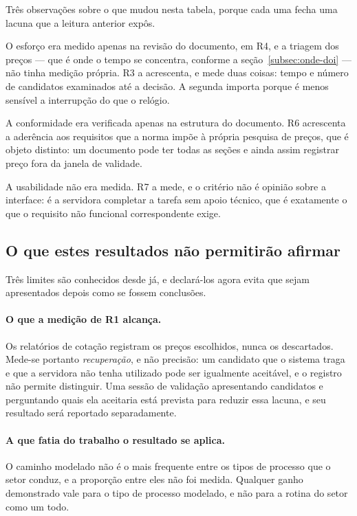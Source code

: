Três observações sobre o que mudou nesta tabela, porque cada uma fecha uma
lacuna que a leitura anterior expôs.

O esforço era medido apenas na revisão do documento, em R4, e a triagem dos
preços — que é onde o tempo se concentra, conforme a
seção~\ref{subsec:onde-doi} — não tinha medição própria. R3 a acrescenta, e
mede duas coisas: tempo e número de candidatos examinados até a decisão. A
segunda importa porque é menos sensível a interrupção do que o relógio.

A conformidade era verificada apenas na estrutura do documento. R6 acrescenta a
aderência aos requisitos que a norma impõe à própria pesquisa de preços, que é
objeto distinto: um documento pode ter todas as seções e ainda assim registrar
preço fora da janela de validade.

A usabilidade não era medida. R7 a mede, e o critério não é opinião sobre a
interface: é a servidora completar a tarefa sem apoio técnico, que é exatamente
o que o requisito não funcional correspondente exige.


\subsection{O que estes resultados não permitirão afirmar}
\label{subsec:limites-avaliacao}

Três limites são conhecidos desde já, e declará-los agora evita que sejam
apresentados depois como se fossem conclusões.

\paragraph{O que a medição de R1 alcança.} Os relatórios de cotação registram os
preços escolhidos, nunca os descartados. Mede-se portanto \emph{recuperação}, e
não precisão: um candidato que o sistema traga e que a servidora não tenha
utilizado pode ser igualmente aceitável, e o registro não permite distinguir. Uma
sessão de validação apresentando candidatos e perguntando quais ela aceitaria
está prevista para reduzir essa lacuna, e seu resultado será reportado
separadamente.

\paragraph{A que fatia do trabalho o resultado se aplica.} O caminho modelado não
é o mais frequente entre os tipos de processo que o setor conduz, e a proporção
entre eles não foi medida. Qualquer ganho demonstrado vale para o tipo de
processo modelado, e não para a rotina do setor como um todo.

